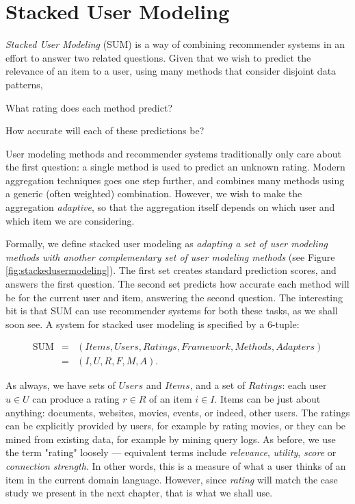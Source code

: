 \section{Stacked User Modeling}
\label{sec:usermetamodeling}

\emph{Stacked User Modeling} (SUM) is a way of combining recommender systems
in an effort to answer two related questions.
Given that we wish to predict the relevance of an item to a user,
using many methods that consider disjoint data patterns,

\begin{enumerate*}
  \item What rating does each method predict?
  \item How accurate will each of these predictions be?
\end{enumerate*}

User modeling methods and recommender systems traditionally only care about the first question:
a single method is used to predict an unknown rating.
Modern aggregation techniques goes one step further, and combines many methods using a generic (often weighted) combination.
However, we wish to make the aggregation \emph{adaptive},
so that the aggregation itself depends on which user and which item we are considering.

Formally, we define stacked user modeling as \emph{adapting a set of user modeling methods
with another complementary set of user modeling methods} 
(see Figure \ref{fig:stackedusermodeling}).
The first set creates standard prediction scores, and answers the first question.
The second set predicts how accurate each method will be for the current user and item,
answering the second question.
The interesting bit is that SUM can use recommender systems for both these tasks, as we shall soon see.
A system for stacked user modeling is specified by a 6-tuple:

\begin{eqnarray*}
  \mathrm{SUM} &=& (Items, Users, Ratings, Framework, Methods, Adapters)\\
               &=& (I,U,R,F,M,A).
\end{eqnarray*}



As always, we have sets of $Users$ and $Items$, 
and a set of $Ratings$: each user $u \in U$ can produce a rating $r \in R$ of an item $i \in I$.
Items can be just about anything: documents, websites, movies, events, or indeed, other users.
The ratings can be explicitly provided by users, for example by rating movies,
or they can be mined from existing data, for example by mining query logs.
As before, we use the term "rating" loosely --- equivalent terms include \emph{relevance}, \emph{utility},
\emph{score} or \emph{connection strength}. In other words, this is a measure of what a user thinks of an item
in the current domain language. However, since \emph{rating} will match the case study we present in the next chapter,
that is what we shall use. 

